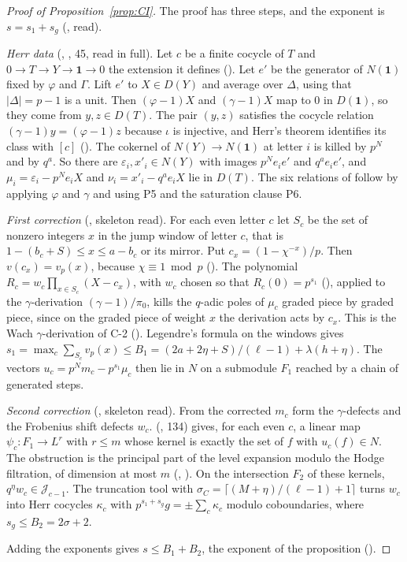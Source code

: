 \documentclass[11pt]{article}
\theoremstyle{definition}
\theoremstyle{remark}
\begin{document}
\begin{proof}[Proof of Proposition~\ref{prop:CI}]
The proof has three steps, and the exponent is $s=s_1+s_g$ (, read).

\emph{Herr data} (, , 45, read in full). Let $c$ be a finite cocycle of $T$ and $0\to T\to Y\to\mathbf 1\to0$ the extension it defines (). Let $e'$ be the generator of $N(\mathbf 1)$ fixed by $\varphi$ and $\Gamma$. Lift $e'$ to $X\in D(Y)$ and average over $\Delta$, using that $\lvert\Delta\rvert=p-1$ is a unit. Then $(\varphi-1)X$ and $(\gamma-1)X$ map to $0$ in $D(\mathbf 1)$, so they come from $y,z\in D(T)$. The pair $(y,z)$ satisfies the cocycle relation $(\gamma-1)y=(\varphi-1)z$ because $\iota$ is injective, and Herr's theorem identifies its class with $[c]$ (). The cokernel of $N(Y)\to N(\mathbf 1)$ at letter $i$ is killed by $p^N$ and by $q^a$. So there are $\varepsilon_i,x'_i\in N(Y)$ with images $p^Ne_ie'$ and $q^ae_ie'$, and $\mu_i=\varepsilon_i-p^Ne_iX$ and $\nu_i=x'_i-q^ae_iX$ lie in $D(T)$. The six relations of  follow by applying $\varphi$ and $\gamma$ and using P5 and the saturation clause P6.

\emph{First correction} (, skeleton read). For each even letter $c$ let $S_c$ be the set of nonzero integers $x$ in the jump window of letter $c$, that is $1-(b_c+S)\le x\le a-b_c$ or its mirror. Put $c_x=(1-\chi^{-x})/p$. Then $v(c_x)=v_p(x)$, because $\chi\equiv1\bmod p$ (). The polynomial $R_c=w_c\prod_{x\in S_c}(X-c_x)$, with $w_c$ chosen so that $R_c(0)=p^{s_1}$ (), applied to the $\gamma$-derivation $(\gamma-1)/\pi_0$, kills the $q$-adic poles of $\mu_c$ graded piece by graded piece, since on the graded piece of weight $x$ the derivation acts by $c_x$. This is the Wach $\gamma$-derivation of C-2 (). Legendre's formula on the windows gives $s_1=\max_c\sum_{S_c}v_p(x)\le B_1=(2a+2\eta+S)/(\ell-1)+\lambda(h+\eta)$. The vectors $u_c=p^N m_c-p^{s_1}\mu_c$ then lie in $N$ on a submodule $F_1$ reached by a chain of generated steps.

\emph{Second correction} (, skeleton read). From the corrected $m_c$ form the $\gamma$-defects and the Frobenius shift defects $w_c$.  (, 134) gives, for each even $c$, a linear map $\psi_c\colon F_1\to L^r$ with $r\le m$ whose kernel is exactly the set of $f$ with $u_c(f)\in N$. The obstruction is the principal part of the level expansion modulo the Hodge filtration, of dimension at most $m$ (, ). On the intersection $F_2$ of these kernels, $q^\eta w_c\in\mathcal J_{c-1}$. The truncation tool  with $\sigma_C=\lceil(M+\eta)/(\ell-1)+1\rceil$ turns $w_c$ into Herr cocycles $\kappa_c$ with $p^{s_1+s_g}g=\pm\sum_c\kappa_c$ modulo coboundaries, where $s_g\le B_2=2\sigma+2$.

Adding the exponents gives $s\le B_1+B_2$, the exponent of the proposition ().
\end{proof}
\end{document}
